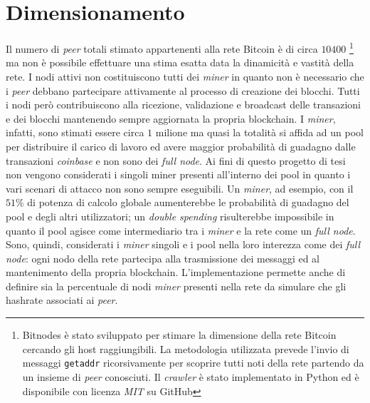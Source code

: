 \section{Dimensionamento}
Il numero di \textit{peer} totali stimato appartenenti alla rete Bitcoin è di circa $10400$ \cite{bitnodes}\footnote{Bitnodes è stato sviluppato per stimare la dimensione della rete Bitcoin cercando gli host raggiungibili. La metodologia utilizzata prevede l'invio di messaggi \texttt{getaddr} ricorsivamente per scoprire tutti noti della rete partendo da un insieme di \textit{peer} conosciuti. Il \textit{crawler} è stato implementato in Python ed è disponibile con licenza \textit{MIT} su GitHub} ma non è possibile effettuare una stima esatta data la dinamicità e vastità della rete. I nodi attivi non costituiscono tutti dei \textit{miner} in quanto non è necessario che i \textit{peer} debbano partecipare attivamente al processo di creazione dei blocchi. Tutti i nodi però contribuiscono alla ricezione, validazione e broadcast delle transazioni e dei blocchi mantenendo sempre aggiornata la propria blockchain. I \textit{miner}, infatti, sono stimati essere circa $1$ milione ma quasi la totalità si affida ad un pool per distribuire il carico di lavoro ed avere maggior probabilità di guadagno dalle transazioni \textit{coinbase} e non sono dei \textit{full node}.
Ai fini di questo progetto di tesi non vengono considerati i singoli miner presenti all'interno dei pool in quanto i vari scenari di attacco non sono sempre eseguibili. Un \textit{miner}, ad esempio, con il $51\%$ di potenza di calcolo globale aumenterebbe le probabilità di guadagno del pool e degli altri utilizzatori; un \textit{double spending} risulterebbe impossibile in quanto il pool agisce come intermediario tra i \textit{miner} e la rete come un \textit{full node}.\newline
Sono, quindi, considerati i \textit{miner} singoli e i pool nella loro interezza come dei \textit{full node}: ogni nodo della rete partecipa alla trasmissione dei messaggi ed al mantenimento della propria blockchain. L'implementazione permette anche di definire sia la percentuale di nodi \textit{miner} presenti nella rete da simulare che gli hashrate associati ai \textit{peer}.
